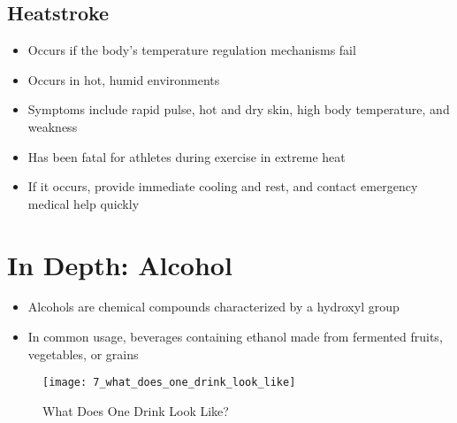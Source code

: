 \documentclass[title={Chapter 7}]{fdsn201notes}
\begin{document}
\subsection{Heatstroke}\label{subsec:heatstroke}
\begin{itemize}
	\item Occurs if the body's temperature regulation mechanisms fail
	\item Occurs in hot, humid environments
	\item Symptoms include rapid pulse, hot and dry skin, high body temperature, and weakness
	\item Has been fatal for athletes during exercise in extreme heat
	\item If it occurs, provide immediate cooling and rest, and contact emergency medical help quickly
\end{itemize}

\section{In Depth: Alcohol}\label{sec:in-depth:-alcohol}
\begin{itemize}
	\item Alcohols are chemical compounds characterized by a hydroxyl group
	\item In common usage, beverages containing ethanol made from fermented fruits, vegetables, or grains
\end{itemize}

\begin{figure}[H]
	\centering
	\texttt{[image: 7\_what\_does\_one\_drink\_look\_like]}
	\caption{What Does One Drink Look Like?}
	\label{fig:what_does_one_drink_look_like?}
\end{figure}
\end{document}
